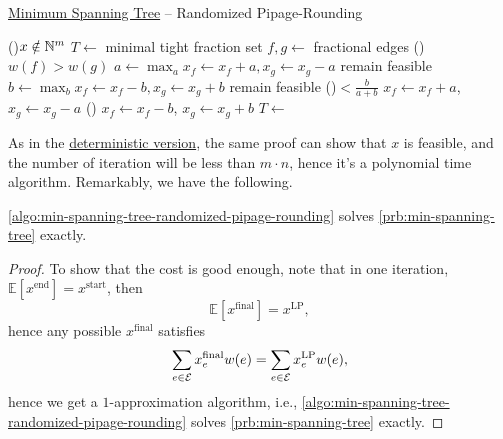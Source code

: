 \begin{algorithm}[H]\label{algo:min-spanning-tree-randomized-pipage-rounding}
	\DontPrintSemicolon
	\caption{\hyperref[prb:min-spanning-tree]{Minimum Spanning Tree} -- Randomized Pipage-Rounding}
	\BlankLine
	\While(){\(x \notin \mathbb{\MakeUppercase{n}} ^{m}\)}{
		\(T\gets\) minimal tight fraction set
		\(f, g\gets \) fractional edges\label{algo:min-spanning-tree-randomized-pipage-rounding-fg}
		\If(){\(w(f) > w(g)\)}{
			\;
		}
		\(a\gets \max_a x_f \gets x_f + a, x_g \gets x_g - a\) remain feasible
		\(b\gets \max_b x_f \gets x_f - b, x_g \gets x_g + b\) remain feasible
		\uIf(){\(< \frac{b}{a + b}\)}{
			\(x_f \gets x_f + a\), \(x_g \gets x_g - a\)\;
		}\Else(){
			\(x_f \gets x_f - b\), \(x_g \gets x_g + b\)\;
		}
	}
	\(T\gets\)
	\;
\end{algorithm}

As in the \hyperref[algo:min-spanning-tree-pipage-rounding]{deterministic version}, the same proof can show that \(x\) is feasible, and the number of iteration will be less than \(m \cdot n\), hence it's a polynomial time algorithm. Remarkably, we have the following.

\begin{theorem}
	\autoref{algo:min-spanning-tree-randomized-pipage-rounding} solves \autoref{prb:min-spanning-tree} exactly.
\end{theorem}
\begin{proof}
	To show that the cost is good enough, note that in one iteration, \(\mathbb{E}\left[x^{\text{end} } \right] = x^{\text{start} }\), then
	\[
		\mathbb{E}\left[ x^{\text{final}} \right] = x^{\text{LP} },
	\]
	hence any possible \(x^{\text{final} }\) satisfies
	\[
		\sum_{e\in \mathcal{\MakeUppercase{e}} } x^{\text{final}}_e w(e)= \sum_{e\in \mathcal{\MakeUppercase{e}} } x_e^{\text{LP}} w(e),
	\]
	hence we get a \(1\)-approximation algorithm, i.e., \autoref{algo:min-spanning-tree-randomized-pipage-rounding} solves \autoref{prb:min-spanning-tree} exactly.
\end{proof}

